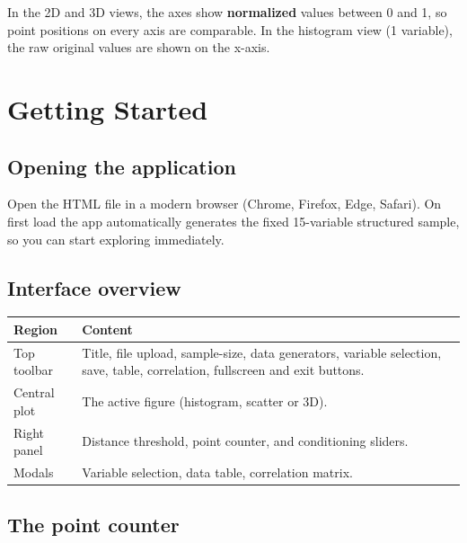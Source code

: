 \documentclass[11pt,a4paper]{article}
\begin{document}
\begin{tipbox}
In the 2D and 3D views, the axes show \textbf{normalized} values between 0 and 1, so point positions on every axis are comparable. In the histogram view (1 variable), the raw original values are shown on the x-axis.
\end{tipbox}

\section{Getting Started}

\subsection{Opening the application}

Open the HTML file in a modern browser (Chrome, Firefox, Edge, Safari). On first load the app automatically generates the fixed 15-variable structured sample, so you can start exploring immediately.

\subsection{Interface overview}

\begin{center}
\begin{tabularx}{\textwidth}{lX}
\toprule
\textbf{Region} & \textbf{Content} \\
\midrule
Top toolbar & Title, file upload, sample-size, data generators, variable selection, save, table, correlation, fullscreen and exit buttons. \\
Central plot & The active figure (histogram, scatter or 3D). \\
Right panel & Distance threshold, point counter, and conditioning sliders. \\
Modals & Variable selection, data table, correlation matrix. \\
\bottomrule
\end{tabularx}
\end{center}

\subsection{The point counter}
\end{document}
